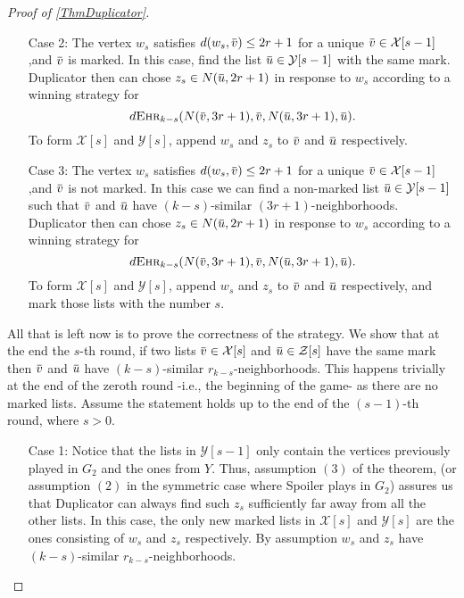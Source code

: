 \documentclass[12pt,notitlepage,a4paper]{article}
\theoremstyle{definition}
\newcommand{\overbar}[1]{\mkern 1.5mu\overline{\mkern-1.5mu#1\mkern-1.5mu}\mkern 1.5mu}
\newcommand{\ehr}{\textsc{Ehr}}
\begin{document}
\begin{proof}[Proof of \cref{ThmDuplicator}]
\begin{itemize}
		\item[Case 2:] The vertex $w_s$ satisfies
		$d(w_s,\overbar{v})\leq 2r+1$ for a unique 
		$\overbar{v}\in \mathcal{X}[s-1]$,and
		$\overbar{v}$ is marked. In this case,
		find the list $\overbar{u}\in \mathcal{Y}[s-1]$
		with the same mark. Duplicator 
		then can chose $z_s\in N(\overbar{u},2r+1)$
		in response to $w_s$ according to a winning strategy
		for
		\[
		d\ehr_{k-s}(N(\overbar{v},3r+1),\overbar{v},
		N(\overbar{u},3r+1),\overbar{u}).
		\]
		To form $ \mathcal{X}[s]$
		and $ \mathcal{Y}[s]$, append $w_s$ and $z_s$
		to $\overbar{v}$ and $\overbar{u}$ respectively.
		
		\item[Case 3:] The vertex $w_s$ satisfies
		$d(w_s,\overbar{v})\leq 2r+1$ for a unique 
		$\overbar{v}\in \mathcal{X}[s-1]$,and
		$\overbar{v}$ is not marked. In this case we 
		can	find a non-marked 
		list $\overbar{u}\in \mathcal{Y}[s-1]$
		such that $\overbar{v}$ and $\overbar{u}$ 
		have $(k-s)$-similar $(3r+1)$-neighborhoods. 
		Duplicator then can chose $z_s\in N(\overbar{u},2r+1)$
		in response to $w_s$ according to a winning strategy
		for
		\[
		d\ehr_{k-s}(N(\overbar{v},3r+1),\overbar{v},
		N(\overbar{u},3r+1),\overbar{u}).
		\]
		To form $ \mathcal{X}[s]$
		and $ \mathcal{Y}[s]$, append $w_s$ and $z_s$
		to $\overbar{v}$ and $\overbar{u}$ respectively,
		and mark those lists with the number $s$. 
	\end{itemize}
	
	All that is left now is to prove the correctness of the
	strategy. We show that at the end the $s$-th round, if 
	two lists $\overbar{v} \in \mathcal{X}[s]$ and 
	$\overbar{u} \in \mathcal{Z}[s]$ have the same mark then
	$\overbar{v}$ and $\overbar{u}$ have $(k-s)$-similar
	$r_{k-s}$-neighborhoods. This happens trivially at
	the end of the zeroth round -i.e., the beginning 
	of the game- as there are no marked lists. Assume the
	statement holds up to the end of the $(s-1)$-th round, 
	where $s>0$. 
	
	\begin{itemize}
		\item[Case 1:] Notice that the lists
		in $\mathcal{Y}[s-1]$ only contain the
		vertices previously played in $G_2$ and 
		the ones from $Y$. Thus, assumption $(3)$ 
		of the theorem, (or assumption $(2)$ in the 
		symmetric
		case where Spoiler plays in $G_2$) assures us
		that Duplicator can always find such $z_s$ 
		sufficiently far away from all the other lists. 
		In this case, the only new marked lists in $\mathcal{X}[s]$
		and $\mathcal{Y}[s]$ are the ones
		consisting of $w_s$ and $z_s$ respectively. By assumption
		$w_s$ and $z_s$ have $(k-s)$-similar $r_{k-s}$-neighborhoods.
		

\end{itemize}
\end{proof}
\end{document}
